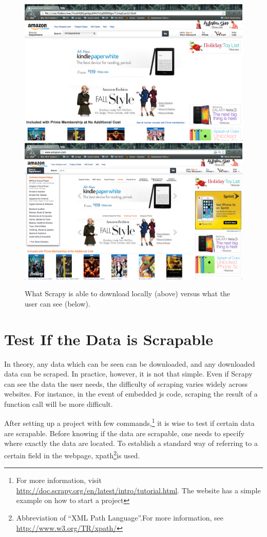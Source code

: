 \documentclass[12pt,twoside,draft]{report}
\begin{document}
\begin{figure}[htp]
\includegraphics[width=\textwidth]{amazon_scrapy_view.png}
\includegraphics[width=\textwidth]{amazon_normal_view.png}
\caption[Comparison of views]
{What Scrapy is able to download locally (above) versus what the user can see (below).}
\end{figure}

\section{Test If the Data is Scrapable}
In theory, any data which can be seen can be downloaded, and any downloaded data can be scraped. In practice, however, it is not that simple. Even if Scrapy can see the data the user needs, the difficulty of scraping varies widely across websites. For instance, in the event of embedded \gls{js} code, scraping the result of a function call will be more difficult.

After setting up a project with few commands,\footnote{For more information, visit \url{http://doc.scrapy.org/en/latest/intro/tutorial.html}. The website has a simple example on how to start a project} it is wise to test if certain data are scrapable. Before knowing if the data are scrapable, one needs to specify where exactly the data are located. To establish a standard way of referring to a certain field in the webpage, \gls{xpath}\footnote{Abbreviation of ``XML Path Language''.For more information, see \url{http://www.w3.org/TR/xpath/}}is used.
\end{document}

